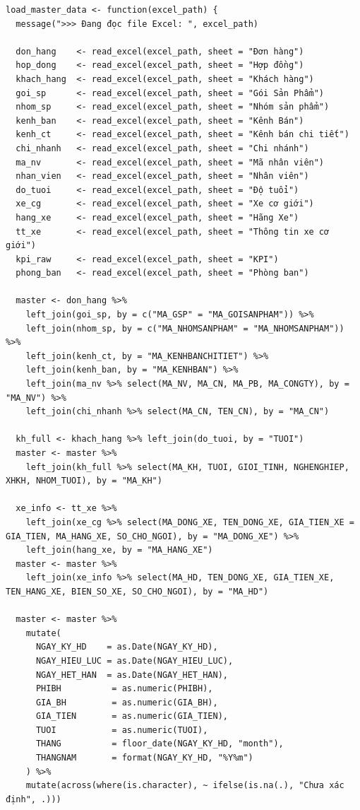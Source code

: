\documentclass[12pt, a4paper]{article}
\begin{document}
\begin{lstlisting}
load_master_data <- function(excel_path) {
  message(">>> Đang đọc file Excel: ", excel_path)
  
  don_hang    <- read_excel(excel_path, sheet = "Đơn hàng")
  hop_dong    <- read_excel(excel_path, sheet = "Hợp đồng")
  khach_hang  <- read_excel(excel_path, sheet = "Khách hàng")
  goi_sp      <- read_excel(excel_path, sheet = "Gói Sản Phẩm")
  nhom_sp     <- read_excel(excel_path, sheet = "Nhóm sản phẩm")
  kenh_ban    <- read_excel(excel_path, sheet = "Kênh Bán")
  kenh_ct     <- read_excel(excel_path, sheet = "Kênh bán chi tiết")
  chi_nhanh   <- read_excel(excel_path, sheet = "Chi nhánh")
  ma_nv       <- read_excel(excel_path, sheet = "Mã nhân viên")
  nhan_vien   <- read_excel(excel_path, sheet = "Nhân viên")
  do_tuoi     <- read_excel(excel_path, sheet = "Độ tuổi")
  xe_cg       <- read_excel(excel_path, sheet = "Xe cơ giới")
  hang_xe     <- read_excel(excel_path, sheet = "Hãng Xe")
  tt_xe       <- read_excel(excel_path, sheet = "Thông tin xe cơ giới")
  kpi_raw     <- read_excel(excel_path, sheet = "KPI")
  phong_ban   <- read_excel(excel_path, sheet = "Phòng ban")
  
  master <- don_hang %>%
    left_join(goi_sp, by = c("MA_GSP" = "MA_GOISANPHAM")) %>%
    left_join(nhom_sp, by = c("MA_NHOMSANPHAM" = "MA_NHOMSANPHAM")) %>%
    left_join(kenh_ct, by = "MA_KENHBANCHITIET") %>%
    left_join(kenh_ban, by = "MA_KENHBAN") %>%
    left_join(ma_nv %>% select(MA_NV, MA_CN, MA_PB, MA_CONGTY), by = "MA_NV") %>%
    left_join(chi_nhanh %>% select(MA_CN, TEN_CN), by = "MA_CN")
  
  kh_full <- khach_hang %>% left_join(do_tuoi, by = "TUOI")
  master <- master %>%
    left_join(kh_full %>% select(MA_KH, TUOI, GIOI_TINH, NGHENGHIEP, XHKH, NHOM_TUOI), by = "MA_KH")
  
  xe_info <- tt_xe %>%
    left_join(xe_cg %>% select(MA_DONG_XE, TEN_DONG_XE, GIA_TIEN_XE = GIA_TIEN, MA_HANG_XE, SO_CHO_NGOI), by = "MA_DONG_XE") %>%
    left_join(hang_xe, by = "MA_HANG_XE")
  master <- master %>%
    left_join(xe_info %>% select(MA_HD, TEN_DONG_XE, GIA_TIEN_XE, TEN_HANG_XE, BIEN_SO_XE, SO_CHO_NGOI), by = "MA_HD")
  
  master <- master %>%
    mutate(
      NGAY_KY_HD    = as.Date(NGAY_KY_HD),
      NGAY_HIEU_LUC = as.Date(NGAY_HIEU_LUC),
      NGAY_HET_HAN  = as.Date(NGAY_HET_HAN),
      PHIBH          = as.numeric(PHIBH),
      GIA_BH         = as.numeric(GIA_BH),
      GIA_TIEN       = as.numeric(GIA_TIEN),
      TUOI           = as.numeric(TUOI),
      THANG          = floor_date(NGAY_KY_HD, "month"),
      THANGNAM       = format(NGAY_KY_HD, "%Y%m")
    ) %>%
    mutate(across(where(is.character), ~ ifelse(is.na(.), "Chưa xác định", .)))
  

\end{lstlisting}
\end{document}
